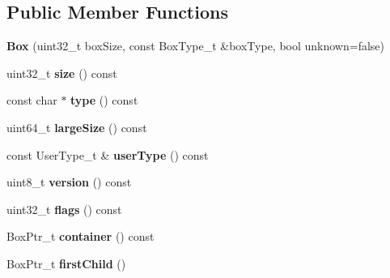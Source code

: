 \subsection*{Public Member Functions}
\begin{DoxyCompactItemize}
\item 
\mbox{\label{classmp4_parser_1_1_box_aca38a71ac4e90b8f1f2a5bb28385a260}} 
{\bfseries Box} (uint32\+\_\+t box\+Size, const Box\+Type\+\_\+t \&box\+Type, bool unknown=false)
\item 
\mbox{\label{classmp4_parser_1_1_box_ad7a87d6c82ee5f030f25349fb9fa37ed}} 
uint32\+\_\+t {\bfseries size} () const
\item 
\mbox{\label{classmp4_parser_1_1_box_a200b3c6ed0b7b9189525a72fbc5e135e}} 
const char $\ast$ {\bfseries type} () const
\item 
\mbox{\label{classmp4_parser_1_1_box_afc7d9acf722110a61d9f29b6f225e0a5}} 
uint64\+\_\+t {\bfseries large\+Size} () const
\item 
\mbox{\label{classmp4_parser_1_1_box_a1dccbe03be56de250bc8e1900955fe98}} 
const User\+Type\+\_\+t \& {\bfseries user\+Type} () const
\item 
\mbox{\label{classmp4_parser_1_1_box_a03f39933e4717612b85cbeaecadb28c4}} 
uint8\+\_\+t {\bfseries version} () const
\item 
\mbox{\label{classmp4_parser_1_1_box_aa9999a2befee633b6be78413469cc37f}} 
uint32\+\_\+t {\bfseries flags} () const
\item 
\mbox{\label{classmp4_parser_1_1_box_a99eb8aaa341a4aaf1a9deb88ca774e89}} 
Box\+Ptr\+\_\+t {\bfseries container} () const
\item 
\mbox{\label{classmp4_parser_1_1_box_aa97e19e5b07b10051b64f697466b737c}} 
Box\+Ptr\+\_\+t {\bfseries first\+Child} ()
\item 
\mbox{\label{classmp4_parser_1_1_box_a08f2cf9ef4039f58be852eae41c9856d}} 

\end{DoxyCompactItemize}
